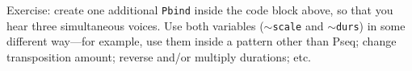 Exercise: create one additional \texttt{Pbind} inside the code block above, so that you hear three simultaneous voices. Use both variables (\texttt{$\sim$scale} and \texttt{$\sim$durs}) in some different way---for example, use them inside a pattern other than Pseq; change transposition amount; reverse and/or multiply durations; etc.

